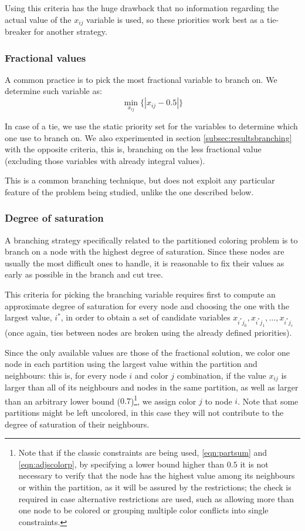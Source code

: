 Using this criteria has the huge drawback that no information regarding the actual value of the $x_{ij}$ variable is used, so these priorities work best as a tie-breaker for another strategy.

\subsubsection{Fractional values}
\label{subsubsec:alg:branch:frac}

A common practice is to pick the most fractional variable to branch on. We determine such variable as:
\[
\min_{x_{ij}} \{ |x_{ij} - 0.5| \}
\]

In case of a tie, we use the static priority set for the variables to determine which one use to branch on. We also experimented in section \ref{subsec:resultsbranching} with the opposite criteria, this is, branching on the less fractional value (excluding those variables with already integral values).

This is a common branching technique, but does not exploit any particular feature of the problem being studied, unlike the one described below.

\subsubsection{Degree of saturation}
\label{subsubsec:alg:branch:dsatur}

A branching strategy specifically related to the partitioned coloring problem is to branch on a node with the highest degree of saturation. Since these nodes are usually the most difficult ones to handle, it is reasonable to fix their values as early as possible in the branch and cut tree.

This criteria for picking the branching variable requires first to compute an approximate degree of saturation for every node and choosing the one with the largest value, $i^*$, in order to obtain a set of candidate variables $x_{i^*j_0}, x_{i^*j_1}, \ldots, x_{i^*j_c}$ (once again, ties between nodes are broken using the already defined priorities).

Since the only available values are those of the fractional solution, we color one node in each partition using the largest value within the partition and neighbours: this is, for every node $i$ and color $j$ combination, if the value $x_{ij}$ is larger than all of its neighbours and nodes in the same partition, as well as larger than an arbitrary lower bound ($0.7$)\footnote{Note that if the classic constraints are being used, \ref{eqn:partsum} and \ref{eqn:adjscolorp}, by specifying a lower bound higher than $0.5$ it is not necessary to verify that the node has the highest value among its neighbours or within the partition, as it will be assured by the restrictions; the check is required in case alternative restrictions are used, such as allowing more than one node to be colored or grouping multiple color conflicts into single constraints.}, we assign color $j$ to node $i$. Note that some partitions might be left uncolored, in this case they will not contribute to the degree of saturation of their neighbours.

